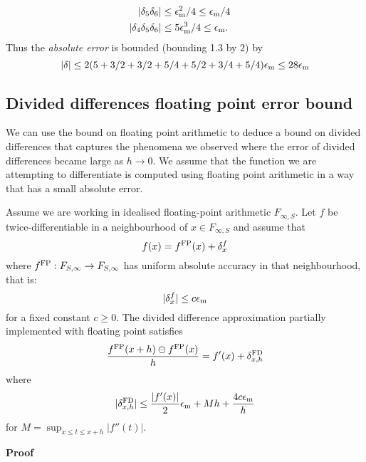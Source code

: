 \begin{example}
\begin{align*}
|\ensuremath{\delta}_5 \ensuremath{\delta}_6| &\ensuremath{\leq}  \ensuremath{\epsilon}_{\rm m}^2/4  \ensuremath{\leq} \ensuremath{\epsilon}_{\rm m}/4 \cr
|\ensuremath{\delta}_4\ensuremath{\delta}_5\ensuremath{\delta}_6| &\ensuremath{\leq} 5\ensuremath{\epsilon}_{\rm m}^3/4 \ensuremath{\leq} \ensuremath{\epsilon}_{\rm m}.
\end{align*}
Thus the \emph{absolute error} is bounded (bounding 1.3 by $2$) by
\[
|\ensuremath{\delta}| \ensuremath{\leq} 2 (5 +  3/2 + 3/2 + 5/4 + 5/2 + 3/4 + 5/4) \ensuremath{\epsilon}_{\rm m} \ensuremath{\leq} 28 \ensuremath{\epsilon}_{\rm m}
\]
\end{example}

\subsection{Divided differences floating point error bound}
We can use the bound on floating point arithmetic to deduce a bound on divided differences that captures the phenomena we observed where the error of divided differences became large as $h \ensuremath{\rightarrow} 0$. We assume that the function we are attempting to differentiate is computed using floating point arithmetic in a way that has a small absolute error.

\begin{theorem} Assume we are working in idealised floating-point arithmetic $F_{\ensuremath{\infty},S}$. Let $f$ be twice-differentiable in a neighbourhood of $x \ensuremath{\in} F_{\ensuremath{\infty},S}$ and assume that
\[
 f(x) = f^{\rm FP}(x) + \ensuremath{\delta}_x^f
\]
where $f^{\rm FP} : F_{S,\ensuremath{\infty}} \ensuremath{\rightarrow} F_{S,\ensuremath{\infty}}$ has uniform absolute accuracy in that neighbourhood, that is:
\[
|\ensuremath{\delta}_x^f| \ensuremath{\leq} c \ensuremath{\epsilon}_{\rm m}
\]
for a fixed constant $c \ensuremath{\geq} 0$. The divided difference approximation partially implemented with floating point satisfies
\[
{f^{\rm FP}(x + h) \ensuremath{\ominus} f^{\rm FP}(x) \over h} = f'(x) + \ensuremath{\delta}_{x,h}^{\rm FD}
\]
where
\[
|\ensuremath{\delta}_{x,h}^{\rm FD}| \ensuremath{\leq} {|f'(x)| \over 2} \ensuremath{\epsilon}_{\rm m} + M h +  {4c \ensuremath{\epsilon}_{\rm m} \over h}
\]
for $M = \sup_{x \ensuremath{\leq} t \ensuremath{\leq} x+h} |f''(t)|$.

\end{theorem}
\textbf{Proof}

